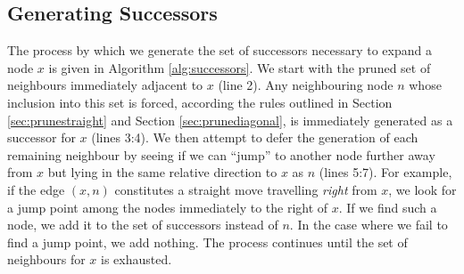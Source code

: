 \subsection{Generating Successors}
The process by which we generate the set of successors necessary to expand a
node $x$ is given in Algorithm \ref{alg:successors}.
We start with the pruned set of neighbours immediately adjacent to $x$ (line 2).
Any neighbouring node $n$ whose inclusion into this set is forced, according the 
rules outlined in Section \ref{sec:prunestraight} and Section 
\ref{sec:prunediagonal}, is immediately generated as a successor for $x$ 
(lines 3:4).
We then attempt to defer the generation of each remaining neighbour by seeing if 
we can ``jump'' to another node further away from $x$ but lying in the same 
relative direction to $x$ as $n$ (lines 5:7). For example, if the edge $(x, n)$ constitutes a
straight move travelling \emph{right} from $x$, we look for a jump point among
the nodes immediately to the right of $x$.
If we find such a node, we add it to the set of successors instead of $n$.
In the case where we fail to find a jump point, we add nothing.
The process continues until the set of neighbours for $x$ is exhausted.



